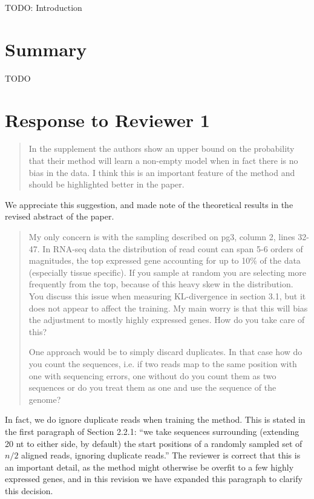 \documentclass{article}
\begin{document}
TODO: Introduction


\section*{Summary}

TODO


\section*{Response to Reviewer 1}

\begin{quote}
In the supplement the authors show an upper bound on the probability that their
method will learn a non-empty model when in fact there is no bias in the data. I
think this is an important feature of the method and should be highlighted
better in the paper.
\end{quote}

We appreciate this suggestion, and made note of the theoretical results in the
revised abstract of the paper.


\begin{quote}
My only concern is with the sampling described on pg3, column 2, lines 32-47.
In RNA-seq data the distribution of read count can span 5-6 orders of
magnitudes, the top expressed gene accounting for up to 10\% of the data
(especially tissue specific). If you sample at random you are selecting more
frequently from the top, because of this heavy skew in the distribution. You
discuss this issue when measuring KL-divergence in section 3.1, but it does not
appear to affect the training. My main worry is that this will bias the
adjustment to mostly highly expressed genes. How do you take care of this?

One approach would be to simply discard duplicates. In that case how do you
count the sequences, i.e. if two reads map to the same position with one with
sequencing errors, one without do you count them as two sequences or do you
treat them as one and use the sequence of the genome?
\end{quote}

In fact, we do ignore duplicate reads when training the method. This is stated
in the first paragraph of Section 2.2.1: ``we take sequences surrounding
(extending 20 nt to either side, by default) the start positions of a randomly
sampled set of $n/2$ aligned reads, ignoring duplicate reads.'' The reviewer is
correct that this is an important detail, as the method might otherwise be
overfit to a few highly expressed genes, and in this revision we have expanded
this paragraph to clarify this decision.
\end{document}
